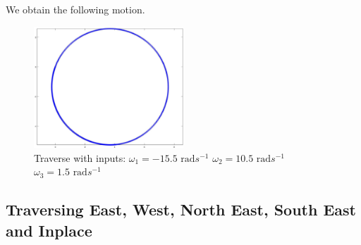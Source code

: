 \documentclass{article}
\begin{document}
We obtain the following motion.

\begin{figure}[H]
	\centering
	\includegraphics[width=0.5\textwidth]{images/traverse_predefined.jpg}
	\caption{Traverse with inputs:
		$\omega_{1} = -15.5 \text{ rad} s^{-1}$
		$\omega_{2} = 10.5 \text{ rad} s^{-1}$
		$\omega_{3} = 1.5 \text{ rad} s^{-1}$
	}
	\label{fig:omni_robot_predefined}
\end{figure}



\subsection{Traversing East, West, North East, South East and Inplace}
\label{subsec:traverse_directions}
\end{document}
